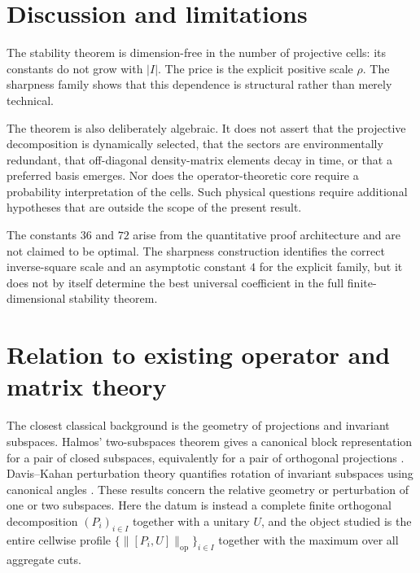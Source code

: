 \documentclass[11pt]{article}
\newcommand{\op}{\mathrm{op}}
\begin{document}
\section{Discussion and limitations}

The stability theorem is dimension-free in the number of projective cells:
its constants do not grow with $|I|$.  The price is the explicit positive
scale $\rho$.  The sharpness family shows that this dependence is structural
rather than merely technical.

The theorem is also deliberately algebraic.  It does not assert that the
projective decomposition is dynamically selected, that the sectors are
environmentally redundant, that off-diagonal density-matrix elements decay
in time, or that a preferred basis emerges.  Nor does the operator-theoretic
core require a probability interpretation of the cells.  Such physical
questions require additional hypotheses that are outside the scope of the
present result.

The constants $36$ and $72$ arise from the quantitative proof architecture
and are not claimed to be optimal.  The sharpness construction identifies the
correct inverse-square scale and an asymptotic constant $4$ for the explicit
family, but it does not by itself determine the best universal coefficient in
the full finite-dimensional stability theorem.

\section{Relation to existing operator and matrix theory}
\label{sec:related}

The closest classical background is the geometry of projections and invariant
subspaces.  Halmos' two-subspaces theorem gives a canonical block
representation for a pair of closed subspaces, equivalently for a pair of
orthogonal projections \cite{Halmos1969TwoSubspaces}.  Davis--Kahan
perturbation theory quantifies rotation of invariant subspaces using canonical
angles \cite{DavisKahan1970}.  These results concern the relative geometry or
perturbation of one or two subspaces.  Here the datum is instead a complete
finite orthogonal decomposition $(P_i)_{i\in I}$ together with a unitary $U$,
and the object studied is the entire cellwise profile
$\{\|[P_i,U]\|_{\op}\}_{i\in I}$ together with the maximum over all aggregate
cuts.
\end{document}
